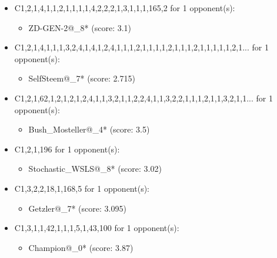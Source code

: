 \begin{appendices}
\begin{itemize}
    \item C1,2,1,4,1,1,2,1,1,1,1,4,2,2,2,1,3,1,1,1,165,2 for 1 opponent(s):
    \begin{multicols}{3}
         \begin{itemize}
            \item ZD-GEN-2@\_8* (score: 3.1)
        \end{itemize}
     \end{multicols}
     
    \item C1,2,1,4,1,1,1,3,2,4,1,4,1,2,4,1,1,1,2,1,1,1,1,2,1,1,1,2,1,1,1,1,1,2,1... for 1 opponent(s):
    \begin{multicols}{3}
         \begin{itemize}
            \item SelfSteem@\_7* (score: 2.715)
        \end{itemize}
     \end{multicols}
     
    \item C1,2,1,62,1,2,1,2,1,2,4,1,1,3,2,1,1,2,2,4,1,1,3,2,2,1,1,1,2,1,1,3,2,1,1... for 1 opponent(s):
    \begin{multicols}{3}
         \begin{itemize}
            \item Bush\_Mosteller@\_4* (score: 3.5)
        \end{itemize}
     \end{multicols}
     
    \item C1,2,1,196 for 1 opponent(s):
    \begin{multicols}{3}
         \begin{itemize}
            \item Stochastic\_WSLS@\_8* (score: 3.02)
        \end{itemize}
     \end{multicols}
     
    \item C1,3,2,2,18,1,168,5 for 1 opponent(s):
    \begin{multicols}{3}
         \begin{itemize}
            \item Getzler@\_7* (score: 3.095)
        \end{itemize}
     \end{multicols}
     
    \item C1,3,1,1,42,1,1,1,5,1,43,100 for 1 opponent(s):
    \begin{multicols}{3}
         \begin{itemize}
            \item Champion@\_0* (score: 3.87)
        \end{itemize}
     \end{multicols}
     

\end{itemize}
\end{appendices}
